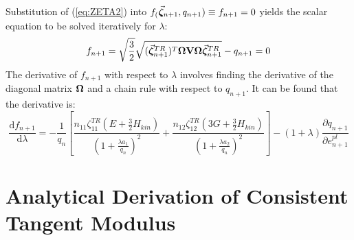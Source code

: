 \begin{appendices}
Substitution of (\ref{eq:ZETA2}) into $f_(\vec{\bm{\zeta}}_{n+1},q_{n+1})\equiv
f_{n+1}=0$ yields the scalar equation to be solved iteratively for $\lambda$:
\begin{equation}
	f_{n+1} =
	\sqrt{\frac{3}{2}}\sqrt{(\vec{\bm{\zeta}}^{TR}_{n+1})^T
		\mathbf{\Omega}\mathbf{V}\mathbf{\Omega}\vec{\bm{\zeta}}^{TR}_{n+1}}- q_{n+1}=0
	\label{eq:SCALAR_FUN}
\end{equation}
The derivative of $f_{n+1}$ with respect to $\lambda$ involves finding the
derivative of the diagonal matrix $\mathbf{\Omega}$ and a chain rule with respect
to $q_{n+1}$. It can be found that the derivative is:
\begin{equation}
	\frac{\text{d} f_{n+1}}{\text{d} \lambda} =
	-\frac{1}{q_n}\left[\frac{n_{11}\zeta_{11}^{TR}(E+
		\frac{3}{2}H_{kin})}{(1+\frac{\lambda a_1}{q_n})^2}+
	\frac{n_{12}\zeta_{12}^{TR}(3G+ \frac{3}{2}H_{kin})}
	{(1+\frac{\lambda a_2}{q_n})^2}  \right] - (1+\lambda)\frac{\partial
		q_{n+1}}{\partial e^{pl}_{n+1}}
	\label{eq:F_DIFF}
\end{equation}


\chapter{Analytical Derivation of Consistent Tangent 
Modulus}\label{appendix:APPENDIX_D}


\end{appendices}
